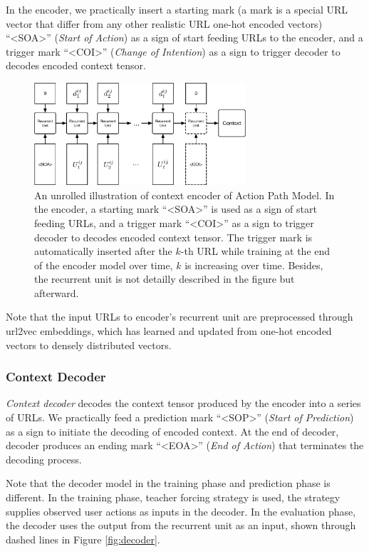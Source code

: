 In the encoder, we practically insert a starting mark (a mark is a special URL vector that 
differ from any other realistic URL one-hot encoded vectors) ``<SOA>'' (\emph{Start of Action})
as a sign of start feeding URLs to the encoder, and a trigger mark ``<COI>'' (\emph{Change of Intention}) as
a sign to trigger decoder to decodes encoded context tensor.

\begin{figure}
    \centering
    \includegraphics[width=0.7\textwidth]{figures/encoder}
    \caption{An unrolled illustration of context encoder of Action Path Model. 
    In the encoder, a starting mark ``<SOA>'' is used as a sign of start feeding URLs, 
    and a trigger mark ``<COI>'' as a sign to trigger decoder to decodes 
    encoded context tensor. The trigger mark is automatically inserted after the $k$-th URL 
    while training at the end of the encoder model over time, $k$ is increasing over time. 
    Besides, the recurrent unit is not detailly described in the figure but afterward.}
    \label{fig:encoder}
\end{figure}

Note that the input URLs to encoder's recurrent unit are preprocessed through 
url2vec embeddings, which has learned and updated from one-hot encoded vectors to 
densely distributed vectors.

\subsubsection{Context Decoder}

\emph{Context decoder} decodes the context tensor produced by the encoder into a series of URLs. 
We practically feed a prediction mark ``<SOP>'' (\emph{Start of Prediction}) 
as a sign to initiate the decoding of encoded context. 
At the end of decoder, decoder produces an ending mark ``<EOA>'' (\emph{End of Action}) 
that terminates the decoding process.

Note that the decoder model in the training phase and prediction phase is different.
In the training phase, teacher forcing strategy \cite{williams1989learning} is used, 
the strategy supplies observed user actions as inputs in the decoder.
In the evaluation phase, the decoder uses the output from the recurrent unit as an input, 
shown through dashed lines in Figure \ref{fig:decoder}.

